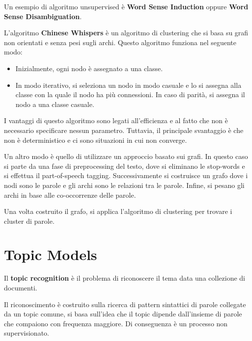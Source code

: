 Un esempio di algoritmo unsupervised è \textbf{Word Sense Induction} oppure
\textbf{Word Sense Disambiguation}.

L'algoritmo \textbf{Chinese Whispers} è un algoritmo di clustering che si basa
su grafi non orientati e senza pesi sugli archi. Questo algoritmo funziona nel
seguente modo:
\begin{itemize}
      \item Inizialmente, ogni nodo è assegnato a una classe.
      \item In modo iterativo, si seleziona un nodo in modo casuale e lo si assegna
            alla classe con la quale il nodo ha più connessioni. In caso di
            parità, si assegna il nodo a una classe casuale.
\end{itemize}
I vantaggi di questo algoritmo sono legati all'efficienza e al fatto che non è
necessario specificare nessun parametro. Tuttavia, il principale svantaggio è
che non è deterministico e ci sono situazioni in cui non converge.

Un altro modo è quello di utilizzare un approccio basato sui grafi. In questo caso
si parte da una fase di preprocessing del testo, dove si eliminano le stop-words
e si effettua il part-of-speech tagging. Successivamente si costruisce un grafo
dove i nodi sono le parole e gli archi sono le relazioni tra le parole. Infine,
si pesano gli archi in base alle co-occorrenze delle parole.

Una volta costruito il grafo, si applica l'algoritmo di clustering per trovare
i cluster di parole. 
\section{Topic Models}
\begin{definizione}
      Il \textbf{topic recognition} è il problema di riconoscere il tema data una
      collezione di documenti.
\end{definizione}

Il riconoscimento è costruito sulla ricerca di pattern sintattici di parole collegate
da un topic comune, si basa sull'idea che il topic dipende dall'insieme di parole
che compaiono con frequenza maggiore. Di conseguenza è un processo non supervisionato.

